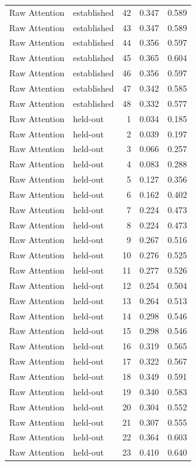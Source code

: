 \begin{tabular}{llrrr}
Raw Attention & established & 42 & 0.347 & 0.589 \\
Raw Attention & established & 43 & 0.347 & 0.589 \\
Raw Attention & established & 44 & 0.356 & 0.597 \\
Raw Attention & established & 45 & 0.365 & 0.604 \\
Raw Attention & established & 46 & 0.356 & 0.597 \\
Raw Attention & established & 47 & 0.342 & 0.585 \\
Raw Attention & established & 48 & 0.332 & 0.577 \\
Raw Attention & held-out & 1 & 0.034 & 0.185 \\
Raw Attention & held-out & 2 & 0.039 & 0.197 \\
Raw Attention & held-out & 3 & 0.066 & 0.257 \\
Raw Attention & held-out & 4 & 0.083 & 0.288 \\
Raw Attention & held-out & 5 & 0.127 & 0.356 \\
Raw Attention & held-out & 6 & 0.162 & 0.402 \\
Raw Attention & held-out & 7 & 0.224 & 0.473 \\
Raw Attention & held-out & 8 & 0.224 & 0.473 \\
Raw Attention & held-out & 9 & 0.267 & 0.516 \\
Raw Attention & held-out & 10 & 0.276 & 0.525 \\
Raw Attention & held-out & 11 & 0.277 & 0.526 \\
Raw Attention & held-out & 12 & 0.254 & 0.504 \\
Raw Attention & held-out & 13 & 0.264 & 0.513 \\
Raw Attention & held-out & 14 & 0.298 & 0.546 \\
Raw Attention & held-out & 15 & 0.298 & 0.546 \\
Raw Attention & held-out & 16 & 0.319 & 0.565 \\
Raw Attention & held-out & 17 & 0.322 & 0.567 \\
Raw Attention & held-out & 18 & 0.349 & 0.591 \\
Raw Attention & held-out & 19 & 0.340 & 0.583 \\
Raw Attention & held-out & 20 & 0.304 & 0.552 \\
Raw Attention & held-out & 21 & 0.307 & 0.555 \\
Raw Attention & held-out & 22 & 0.364 & 0.603 \\
Raw Attention & held-out & 23 & 0.410 & 0.640 \\

\end{tabular}
